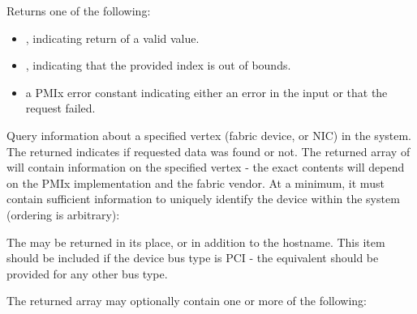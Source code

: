 \begin{arglist}
\end{arglist}

Returns one of the following:

\begin{itemize}
    \item {}, indicating return of a valid value.
    \item {}, indicating that the provided index is out of bounds.
    \item a \ac{PMIx} error constant indicating either an error in the input or that the request failed.
\end{itemize}

\descr

Query information about a specified vertex (fabric device, or \ac{NIC}) in the system. The returned  indicates if requested data was found or not. The returned array of  will contain information on the specified vertex - the exact contents will depend on the \ac{PMIx} implementation and the fabric vendor. At a minimum, it must contain sufficient information to uniquely identify the device within the system (ordering is arbitrary):

\reqattrstart
{} The  may be returned in its place, or in addition to the hostname.
\pastePRIAttributeItemEnd
{}
 This item should be included if the device bus type is \ac{PCI} - the equivalent should be provided for any other bus type.
\pastePRIAttributeItemEnd

\reqattrend

The returned array may optionally contain one or more of the following:

\optattrstart
{}
\optattrend

